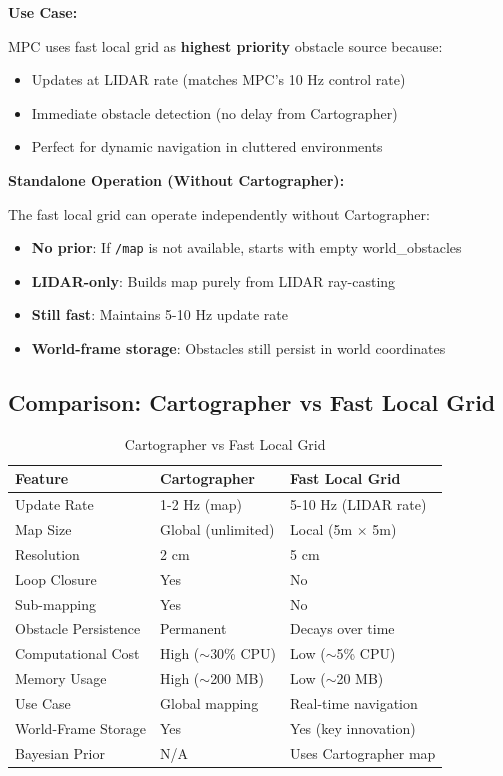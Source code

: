 \documentclass[11pt]{article}
\begin{document}
\textbf{Use Case:}

MPC uses fast local grid as \textbf{highest priority} obstacle source because:
\begin{itemize}
    \item Updates at LIDAR rate (matches MPC's 10 Hz control rate)
    \item Immediate obstacle detection (no delay from Cartographer)
    \item Perfect for dynamic navigation in cluttered environments
\end{itemize}

\textbf{Standalone Operation (Without Cartographer):}

The fast local grid can operate independently without Cartographer:

\begin{itemize}
    \item \textbf{No prior}: If \texttt{/map} is not available, starts with empty world\_obstacles
    \item \textbf{LIDAR-only}: Builds map purely from LIDAR ray-casting
    \item \textbf{Still fast}: Maintains 5-10 Hz update rate
    \item \textbf{World-frame storage}: Obstacles still persist in world coordinates
\end{itemize}

\subsection{Comparison: Cartographer vs Fast Local Grid}

\begin{table}[H]
\centering
\caption{Cartographer vs Fast Local Grid}
\begin{tabular}{|l|l|l|}
\hline
\textbf{Feature} & \textbf{Cartographer} & \textbf{Fast Local Grid} \\
\hline
Update Rate & 1-2 Hz (map) & 5-10 Hz (LIDAR rate) \\
Map Size & Global (unlimited) & Local (5m $\times$ 5m) \\
Resolution & 2 cm & 5 cm \\
Loop Closure & Yes & No \\
Sub-mapping & Yes & No \\
Obstacle Persistence & Permanent & Decays over time \\
Computational Cost & High ($\sim$30\% CPU) & Low ($\sim$5\% CPU) \\
Memory Usage & High ($\sim$200 MB) & Low ($\sim$20 MB) \\
Use Case & Global mapping & Real-time navigation \\
World-Frame Storage & Yes & Yes (key innovation) \\
Bayesian Prior & N/A & Uses Cartographer map \\
\hline
\end{tabular}
\end{table}
\end{document}
